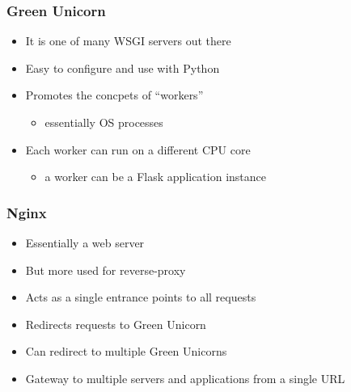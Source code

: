 \documentclass{beamer}
\begin{document}
\begin{frame}
\frametitle<presentation>{Green Unicorn}


\begin{itemize}
  \item It is one of many WSGI servers out there
  \item Easy to configure and use with Python
  \item Promotes the concpets of ``workers''
  \begin{itemize} \item essentially OS processes \end{itemize}
  \item Each worker can run on a different CPU core
  \begin{itemize} \item a worker can be a Flask application instance
  \end{itemize}
\end{itemize}

\end{frame}

\begin{frame}
\frametitle<presentation>{Nginx}


\begin{itemize}
  \item Essentially a web server
  \item But more used for reverse-proxy
  \item Acts as a single entrance points to all requests
  \item Redirects requests to Green Unicorn
  \item Can redirect to multiple Green Unicorns
  \item Gateway to multiple servers and applications from a single URL 
\end{itemize}

\end{frame}
\end{document}
